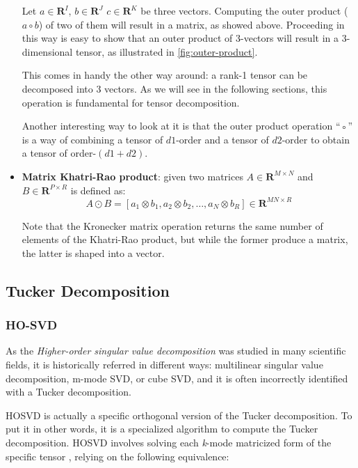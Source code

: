 \begin{itemize}
        Let $a \in \mathbf{R}^I$, $b \in \mathbf{R}^J$  $c \in \mathbf{R}^K$ be three vectors. Computing the outer 
        product ($a  \circ  b$) of two of them will result in a matrix, as showed above. Proceeding in this way is easy to show that an outer product of 3-vectors will result in a 3-dimensional tensor, as illustrated in \ref{fig:outer-product}.
        
        This comes in handy the other way around: a rank-1 tensor can be decomposed into 3 vectors. As we will see in the following sections, this operation is fundamental for tensor decomposition.
        
        Another interesting way to look at it is that the outer product operation “◦” is a way of combining a tensor of $d1$-order and a tensor of $d2$-order to obtain a tensor of order-$(d1+d2)$.

    \item \textbf{Matrix Khatri-Rao product}: given two matrices $A \in \mathbf{R}^{M \times N}$ and $B \in            \mathbf{R}^{P \times R}$ is defined as: 
        \begin{equation}
            A \odot B = [a_1 \otimes b_1, a_2 \otimes b_2, \ldots, a_N \otimes b_R] \in \mathbf{R}^{MN \times R}
        \end{equation}
        
        Note that the Kronecker matrix operation returns the same number of elements of the Khatri-Rao product, but while the former produce a matrix, the latter is shaped into a vector.   

\end{itemize}


\subsection{Tucker Decomposition}


\subsubsection{HO-SVD}
As the \emph{Higher-order singular value decomposition} was studied in many scientific fields, it is historically referred in different ways:  multilinear singular value decomposition, m-mode SVD, or cube SVD, and it is often incorrectly identified with a Tucker decomposition. 

HOSVD is actually a specific orthogonal version of the Tucker decomposition. To put it in other words, it is a specialized algorithm to compute the Tucker decomposition. HOSVD involves solving each \emph{k}-mode matricized form of the specific tensor \parencite{WTucker}, relying on the following equivalence: \\

